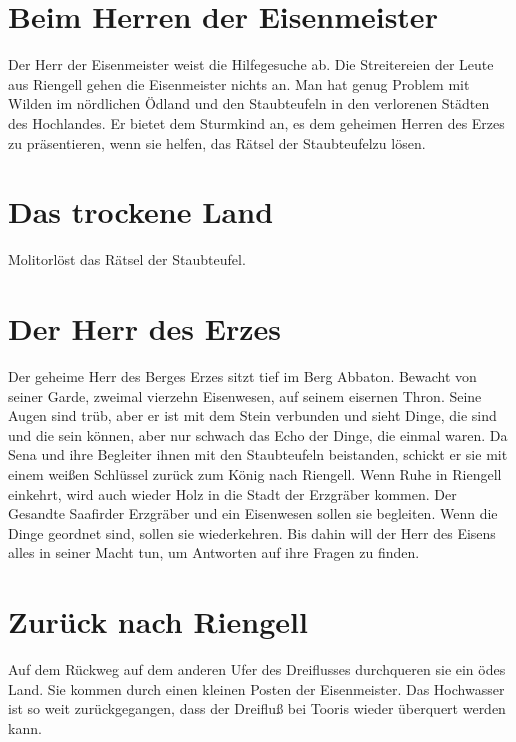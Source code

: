 \documentclass[12pt,a4paper,onecolumn,twoside,ngerman]{book}
\newcommand{\Molitor}{Molitor}
\newcommand{\Sena}{Sena}
\newcommand{\Sturmkind}{Sturmkind}
\newcommand{\Rhingell}{Riengell}
\newcommand{\Dreifluss}{Dreifluß}
\newcommand{\Toris}{Tooris}
\newcommand{\Eisenmeister}{Eisenmeister}
\newcommand{\Abaton}{Abbaton}
\newcommand{\Safir}{Saafir}
\newcommand{\Staubteufel}{Staubteufel}
\begin{document}
{\section{Beim Herren der {\Eisenmeister}}
Der Herr der {\Eisenmeister} weist die Hilfegesuche ab. Die Streitereien der Leute aus {\Rhingell}  gehen die {\Eisenmeister} nichts an. Man hat genug Problem mit Wilden im nördlichen Ödland und den {\Staubteufel}n in den verlorenen Städten des Hochlandes.\linebreak 
Er bietet dem {\Sturmkind} an, es dem geheimen Herren des Erzes zu präsentieren, wenn sie helfen, das Rätsel der \Staubteufel zu lösen.

\section{Das trockene Land}
{\Molitor}löst das Rätsel der {\Staubteufel}.

\section{Der Herr des Erzes}
Der geheime Herr des Berges Erzes sitzt tief im Berg {\Abaton}. Bewacht von seiner Garde, zweimal vierzehn Eisenwesen, auf seinem eisernen Thron. Seine Augen sind trüb, aber er ist mit dem Stein verbunden und sieht Dinge, die sind und die sein können, aber nur schwach das Echo der Dinge, die einmal waren.\linebreak
Da {\Sena} und ihre Begleiter ihnen mit den Staubteufeln beistanden, schickt er sie mit einem weißen Schlüssel zurück zum König nach {\Rhingell}. Wenn Ruhe in {\Rhingell} einkehrt, wird auch wieder Holz in die Stadt der Erzgräber kommen. Der Gesandte \Safir der Erzgräber und ein Eisenwesen sollen sie begleiten.\linebreak
Wenn die Dinge geordnet sind, sollen sie wiederkehren. Bis dahin will der Herr des Eisens alles in seiner Macht tun, um Antworten auf ihre Fragen zu finden.

\section{Zurück nach {\Rhingell}}
Auf dem Rückweg auf dem anderen Ufer des Dreiflusses durchqueren sie ein ödes Land. Sie kommen durch einen kleinen Posten der {\Eisenmeister}.\linebreak 
Das Hochwasser ist so weit zurückgegangen, dass der {\Dreifluss} bei {\Toris} wieder überquert werden kann.

}
\end{document}
